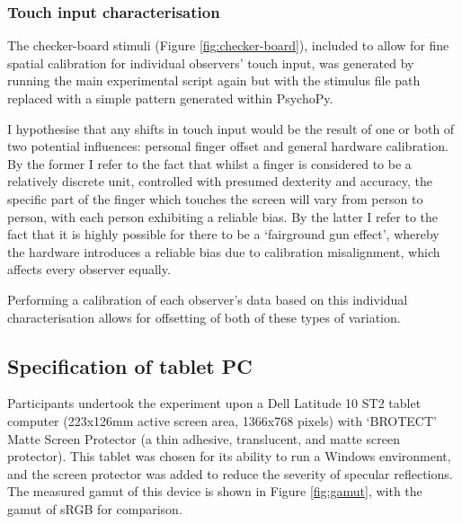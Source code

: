 \subsubsection{Touch input characterisation} \label{sec:touch}
The checker-board stimuli (Figure \ref{fig:checker-board}), included to allow for fine spatial calibration for individual observers' touch input, was generated by running the main experimental script again but with the stimulus file path replaced with a simple pattern generated within PsychoPy.

I hypothesise that any shifts in touch input would be the result of one or both of two potential influences: personal finger offset and general hardware calibration. By the former I refer to the fact that whilst a finger is considered to be a relatively discrete unit, controlled with presumed dexterity and accuracy, the specific part of the finger which touches the screen will vary from person to person, with each person exhibiting a reliable bias. By the latter I refer to the fact that it is highly possible for there to be a `fairground gun effect', whereby the hardware introduces a reliable bias due to calibration misalignment, which affects every observer equally.

Performing a calibration of each observer's data based on this individual characterisation allows for offsetting of both of these types of variation. 

\subsection{Specification of tablet PC} \label{sec:spec}

Participants undertook the experiment upon a Dell Latitude 10 ST2 tablet computer (223x126mm active screen area, 1366x768 pixels) with `BROTECT' Matte Screen Protector (a thin adhesive, translucent, and matte screen protector). This tablet was chosen for its ability to run a Windows environment, and the screen protector was added to reduce the severity of specular reflections. The measured gamut of this device is shown in Figure \ref{fig:gamut}, with the gamut of sRGB for comparison.

